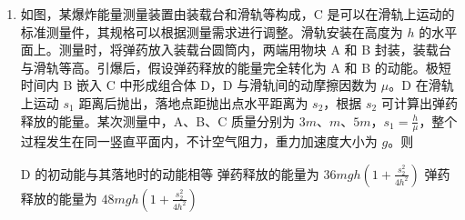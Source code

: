 \documentclass[\gkver]{gaokaozhenti}
\begin{document}
\begin{enumerate}
{$I=\frac{BLv_{0}}{R}=\frac{BLv_{0}}{Lr_{0}}=\frac{Bv_{0}}{r_{0}}$

可得 $F=\frac{B^{2}Lv_{0}}{r_{0}}$

由于金属杆运动过程中接入导轨中的长度 $L$ 在变化，故 $F$ 在变化，故 B 错误；

C．取一微小时间 $\Delta t$ 内，设此时金属杆接入导轨中的长度为 $L'$，根据动量定理有

$-BI'L'\Delta t=-BL'q'=m\Delta v$

同时有 $q=\frac{\frac{\Delta\Phi}{\Delta t}}{L'r_{0}}\cdot\Delta t=\frac{\Delta\Phi}{L'r_{0}}=\frac{B\cdot\Delta S}{L'r_{0}}$

联立得 $-\frac{B^{2}\Delta S}{r_{0}}=m\Delta v$

对从开始到金属杆停止运动时整个过程累积可得 $-\frac{B^{2}S}{r_{0}}=0-mv_{0}$

解得此时金属杆与导轨围成的面积为 $S=\frac{mv_{0}r_{0}}{B^{2}}$

故 C 正确；

D．若金属杆的初速度减半，根据前面分析可知当金属杆停止运动时金属杆与导轨围成的面积为 $S'=\frac{1}{2}S$，根据抛物线的图像规律可知此时金属杆停止运动时经过的距离大于原来的一半，故 D 错误。

故选 AC。
}

\item
如图，某爆炸能量测量装置由装载台和滑轨等构成，C 是可以在滑轨上运动的标准测量件，其规格可以根据测量需求进行调整。滑轨安装在高度为 $h$ 的水平面上。测量时，将弹药放入装载台圆筒内，两端用物块 A 和 B 封装，装载台与滑轨等高。引爆后，假设弹药释放的能量完全转化为 A 和 B 的动能。极短时间内 B 嵌入 C 中形成组合体 D，D 与滑轨间的动摩擦因数为 $\mu$。D 在滑轨上运动 $s_{1}$ 距离后抛出，落地点距抛出点水平距离为 $s_{2}$，根据 $s_{2}$ 可计算出弹药释放的能量。某次测量中，A、B、C 质量分别为 $3m$、$m$、$5m$，$s_{1}=\frac{h}{\mu}$，整个过程发生在同一竖直平面内，不计空气阻力，重力加速度大小为 $g$。则

\onepicture[w=9.60cm]{}

{D 的初动能与其落地时的动能相等}
{弹药释放的能量为 $36mgh(1+\frac{s_{2}^{2}}{4h^{2}})$}
{弹药释放的能量为 $48mgh(1+\frac{s_{2}^{2}}{4h^{2}})$}

\end{enumerate}
\end{document}
